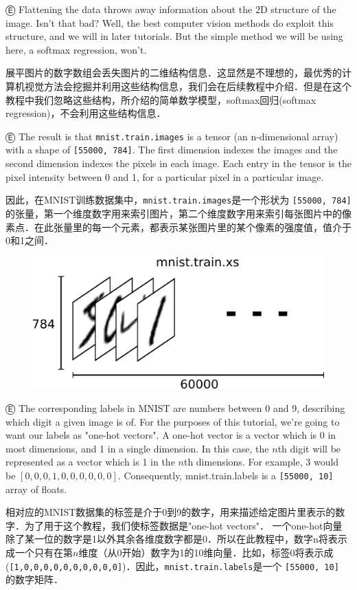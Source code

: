 Ⓔ \textcolor{etc}{Flattening the data throws away information about the 2D structure of the image. Isn't that bad? Well, the best computer vision methods do exploit this structure, and we will in later tutorials. But the simple method we will be using here, a softmax regression, won't.}

展平图片的数字数组会丢失图片的二维结构信息．这显然是不理想的，最优秀的计算机视觉方法会挖掘并利用这些结构信息，我们会在后续教程中介绍．但是在这个教程中我们忽略这些结构，所介绍的简单数学模型，softmax回归(softmax regression)，不会利用这些结构信息．

Ⓔ \textcolor{etc}{The result is that \lstinline{mnist.train.images} is a tensor (an n-dimensional array) with a shape of \lstinline{[55000, 784]}. The first dimension indexes the images and the second dimension indexes the pixels in each image. Each entry in the tensor is the pixel intensity between 0 and 1, for a particular pixel in a particular image.}

因此，在MNIST训练数据集中，\lstinline{mnist.train.images}是一个形状为 \lstinline{[55000, 784]} 的张量，第一个维度数字用来索引图片，第二个维度数字用来索引每张图片中的像素点．在此张量里的每一个元素，都表示某张图片里的某个像素的强度值，值介于0和1之间．

\begin{figure}[htbp]
\centering
\includegraphics[width=.65\textwidth]{../SOURCE/images/mnist-train-xs.png}
\caption{}
\end{figure}

Ⓔ The corresponding labels in MNIST are numbers between 0 and 9, describing which digit a given image is of. For the purposes of this tutorial, we're going to want our labels as "one-hot vectors". A one-hot vector is a vector which is 0 in most dimensions, and 1 in a single dimension. In this case, the $n$th digit will be represented as a vector which is 1 in the $n$th dimensions. For example, 3 would be $[0,0,0,1,0,0,0,0,0,0]$. Consequently, mnist.train.labels is a \lstinline{[55000, 10]} array of floats.

相对应的MNIST数据集的标签是介于0到9的数字，用来描述给定图片里表示的数字．为了用于这个教程，我们使标签数据是"one-hot vectors"． 一个one-hot向量除了某一位的数字是1以外其余各维度数字都是0．所以在此教程中，数字n将表示成一个只有在第$n$维度（从0开始）数字为1的10维向量．比如，标签0将表示成(\lstinline{[1,0,0,0,0,0,0,0,0,0,0]})．因此，\lstinline{mnist.train.labels}是一个 \lstinline{[55000, 10]} 的数字矩阵．

